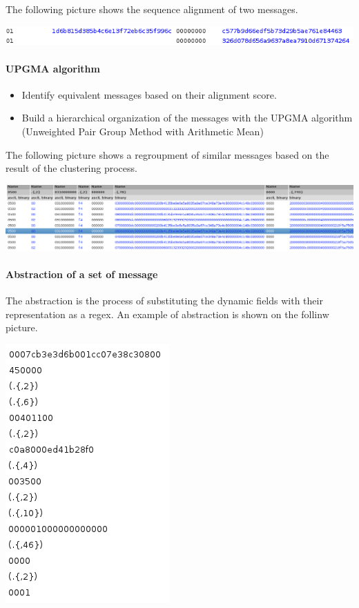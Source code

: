 \documentclass[letterpaper,10pt,english]{sphinxmanual}
\begin{document}
The following picture shows the sequence alignment of two messages.

\includegraphics{ExampleOfAligning.png}


\paragraph{UPGMA algorithm}
\label{modelization/vocabular:upgma-algorithm}\begin{itemize}
\item {} 
Identify equivalent messages based on their alignment score.

\item {} 
Build a hierarchical organization of the messages with the UPGMA
algorithm (Unweighted Pair Group Method with Arithmetic Mean)

\end{itemize}

The following picture shows a regroupment of similar messages based on the result of the clustering process.

\includegraphics{ExampleOfMultipleAlignment.png}


\paragraph{Abstraction of a set of message}
\label{modelization/vocabular:abstraction-of-a-set-of-message}
The abstraction is the process of substituting the dynamic fields with their representation as a regex. An example of abstraction is shown on the follinw picture.

\includegraphics{message_abstraction.png}
\end{document}
